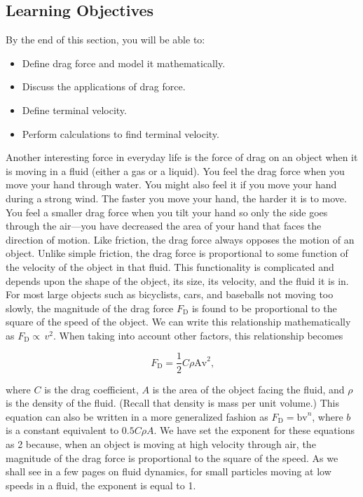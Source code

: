 \documentclass[
]{book}
\providecommand{\tightlist}{%
  \setlength{\itemsep}{0pt}\setlength{\parskip}{0pt}}
\newenvironment{learning-objectives}{}{}
\begin{document}
\hypertarget{import-auto-id0000029}{}
\begin{learning-objectives}

\hypertarget{learning-objectives-22}{%
\subsection{Learning Objectives}\label{learning-objectives-22}}

By the end of this section, you will be able to:

\begin{itemize}
\tightlist
\item
  Define drag force and model it mathematically.
\item
  Discuss the applications of drag force.
\item
  Define terminal velocity.
\item
  Perform calculations to find terminal velocity.
\end{itemize}

\end{learning-objectives}

Another interesting force in everyday life is the force of drag on an
object when it is moving in a fluid (either a gas or a liquid). You feel
the drag force when you move your hand through water. You might also
feel it if you move your hand during a strong wind. The faster you move
your hand, the harder it is to move. You feel a smaller drag force when
you tilt your hand so only the side goes through the air---you have
decreased the area of your hand that faces the direction of motion. Like
friction, the \protect\hypertarget{import-auto-id1165298930276}{}{drag force} always opposes the motion of an object. Unlike simple
friction, the drag force is proportional to some function of the
velocity of the object in that fluid. This functionality is complicated
and depends upon the shape of the object, its size, its velocity, and
the fluid it is in. For most large objects such as bicyclists, cars, and
baseballs not moving too slowly, the magnitude of the drag force
\(F_{\text{D}}{}\) is found to be proportional to the square of the speed
of the object. We can write this relationship mathematically as
\emph{\({F_{\text{D}} \propto \, v^{2}}{}\)}. When taking into account other
factors, this relationship becomes

\leavevmode\hypertarget{eip-871}{}%
\[{{F_{\text{D}} =}\frac{1}{2}C\rho\text{Av}^{2}}{}\text{,}\]

where \(C{}\) is the drag coefficient, \(A{}\) is the area of the object
facing the fluid, and \(\rho{}\) is the density of the fluid. (Recall that
density is mass per unit volume.) This equation can also be written in a
more generalized fashion as \({F_{\text{D}} = \text{bv}^{n}}{}\), where
\(b{}\)\emph{} is a constant equivalent to
\({0\text{.5}{C\rho A}}{}\). We have set the exponent for these equations
as 2 because, when an object is moving at high velocity through air, the
magnitude of the drag force is proportional to the square of the speed.
As we shall see in a few pages on fluid dynamics, for small particles
moving at low speeds in a fluid, the exponent is equal to 1.
\end{document}
